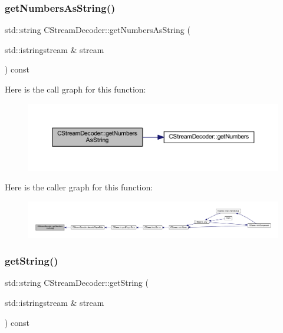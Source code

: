\subsubsection{\texorpdfstring{get\+Numbers\+As\+String()}{getNumbersAsString()}}
{\footnotesize\ttfamily std\+::string C\+Stream\+Decoder\+::get\+Numbers\+As\+String (\begin{DoxyParamCaption}\item[{std\+::istringstream \&}]{stream }\end{DoxyParamCaption}) const}

Here is the call graph for this function\+:\nopagebreak
\begin{figure}[H]
\begin{center}
\leavevmode
\includegraphics[width=350pt]{class_c_stream_decoder_a5df71ab29ca4dc60f6c628fcb4a77949_cgraph}
\end{center}
\end{figure}
Here is the caller graph for this function\+:\nopagebreak
\begin{figure}[H]
\begin{center}
\leavevmode
\includegraphics[width=350pt]{class_c_stream_decoder_a5df71ab29ca4dc60f6c628fcb4a77949_icgraph}
\end{center}
\end{figure}
\mbox{\label{class_c_stream_decoder_a736a4660fb1fc91ffc7345050f815994}} 
\subsubsection{\texorpdfstring{get\+String()}{getString()}}
{\footnotesize\ttfamily std\+::string C\+Stream\+Decoder\+::get\+String (\begin{DoxyParamCaption}\item[{std\+::istringstream \&}]{stream }\end{DoxyParamCaption}) const}

